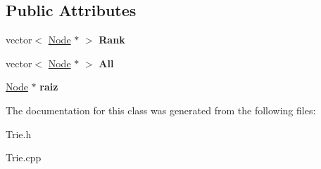 \subsection*{Public Attributes}
\begin{DoxyCompactItemize}
\item 
\hypertarget{classTrie_a2cd26b07a9cca25c4ef98d08d41a71fb}{
vector$<$ \hyperlink{classNode}{Node} $\ast$ $>$ {\bfseries Rank}}
\label{classTrie_a2cd26b07a9cca25c4ef98d08d41a71fb}

\item 
\hypertarget{classTrie_ab3bbc4c6400f758f38e91efcb232e710}{
vector$<$ \hyperlink{classNode}{Node} $\ast$ $>$ {\bfseries All}}
\label{classTrie_ab3bbc4c6400f758f38e91efcb232e710}

\item 
\hypertarget{classTrie_ac04868b4744179074969cf3073a8cefa}{
\hyperlink{classNode}{Node} $\ast$ {\bfseries raiz}}
\label{classTrie_ac04868b4744179074969cf3073a8cefa}

\end{DoxyCompactItemize}


The documentation for this class was generated from the following files:\begin{DoxyCompactItemize}
\item 
Trie.h\item 
Trie.cpp\end{DoxyCompactItemize}
